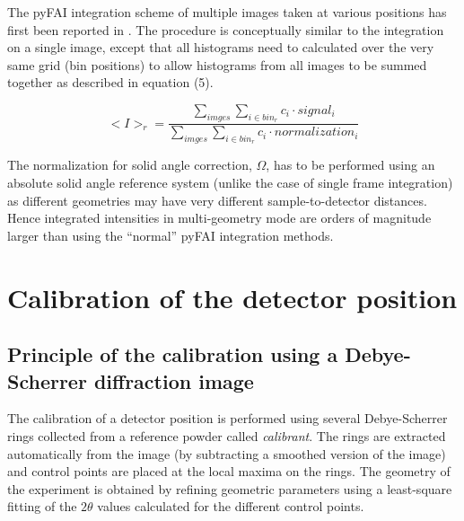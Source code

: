 \documentclass[preprint]{iucr}              %
\begin{document}
The pyFAI integration scheme of multiple images taken at various positions has
first been reported in . 
The procedure is conceptually similar to the integration on a single image,
except that all histograms need to calculated over the very same
grid (bin positions) to allow histograms from all images to be summed together as described in equation (5). 

\begin{equation}
<I>_{r} = \frac{\sum\limits_{imges} \sum\limits_{i \in bin_r} c_i \cdot
signal_i} {\sum\limits_{imges} \sum\limits_{i \in bin_r} c_i \cdot
normalization_i} 
\end{equation}

The normalization for solid angle correction, $\Omega$, has to be performed
using an absolute solid angle reference system (unlike the case of single
frame integration) as different geometries may have very different
sample-to-detector distances.
Hence integrated intensities in multi-geometry mode are orders of
magnitude larger than using the ``normal'' pyFAI integration methods.

\section{Calibration of the detector position}

\subsection{Principle of the calibration using a Debye-Scherrer diffraction
image}
The calibration of a detector position is performed using several Debye-Scherrer
rings collected from a reference powder called \textit{calibrant}.
The rings are extracted automatically from the image (by subtracting a smoothed 
version of the image) and control points are placed at the
local maxima on the rings.
The geometry of the experiment is obtained by refining geometric parameters using 
a least-square fitting of the $2\theta$ values calculated for the different control points.
\end{document}
